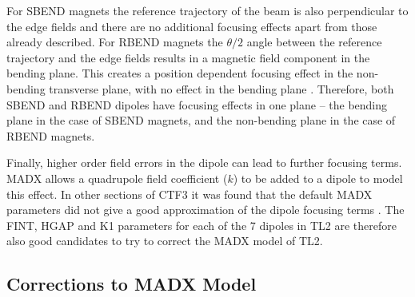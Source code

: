 
For SBEND magnets the reference trajectory of the beam is also perpendicular to the edge fields and there are no additional focusing effects apart from those already described. For RBEND magnets the \(\theta/2\) angle between the reference trajectory and the edge fields results in a magnetic field component in the bending plane. This creates a position dependent focusing effect in the non-bending transverse plane, with no effect in the bending plane \cite{mackay}. Therefore, both SBEND and RBEND dipoles have focusing effects in one plane -- the bending plane in the case of SBEND magnets, and the non-bending plane in the case of RBEND magnets.

Finally, higher order field errors in the dipole can lead to further focusing terms. MADX allows a quadrupole field coefficient (\(k\)) to be added to a dipole to model this effect. In other sections of CTF3 it was found that the default MADX parameters did not give a good approximation of the dipole focusing terms \cite{benOptics}. The FINT, HGAP and K1 parameters for each of the 7 dipoles in TL2 are therefore also good candidates to try to correct the  MADX model of TL2.

\subsection{Corrections to MADX Model}
\label{ss:modelCorrections}

